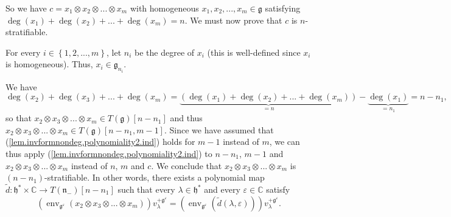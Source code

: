 \documentclass
[numbers=enddot,12pt,final,onecolumn,german,notitlepage]{scrartcl}%
\theoremstyle{definition}
\begin{document}
So we have $c=x_{1}\otimes x_{2}\otimes...\otimes x_{m}$ with
homogeneous\textbf{ }$x_{1},x_{2},...,x_{m}\in\mathfrak{g}$ satisfying
$\deg\left(  x_{1}\right)  +\deg\left(  x_{2}\right)  +...+\deg\left(
x_{m}\right)  =n$. We must now prove that $c$ is $n$-stratifiable.

For every $i\in\left\{  1,2,...,m\right\}  $, let $n_{i}$ be the degree of
$x_{i}$ (this is well-defined since $x_{i}$ is homogeneous). Thus, $x_{i}%
\in\mathfrak{g}_{n_{i}}$.

We have%
\[
\deg\left(  x_{2}\right)  +\deg\left(  x_{3}\right)  +...+\deg\left(
x_{m}\right)  =\underbrace{\left(  \deg\left(  x_{1}\right)  +\deg\left(
x_{2}\right)  +...+\deg\left(  x_{m}\right)  \right)  }_{=n}-\underbrace{\deg
\left(  x_{1}\right)  }_{=n_{1}}=n-n_{1},
\]
so that $x_{2}\otimes x_{3}\otimes...\otimes x_{m}\in T\left(  \mathfrak{g}%
\right)  \left[  n-n_{1}\right]  $ and thus $x_{2}\otimes x_{3}\otimes
...\otimes x_{m}\in T\left(  \mathfrak{g}\right)  \left[  n-n_{1},m-1\right]
$. Since we have assumed that (\ref{lem.invformnondeg.polynomiality2.ind})
holds for $m-1$ instead of $m$, we can thus apply
(\ref{lem.invformnondeg.polynomiality2.ind}) to $n-n_{1}$, $m-1$ and
$x_{2}\otimes x_{3}\otimes...\otimes x_{m}$ instead of $n$, $m$ and $c$. We
conclude that $x_{2}\otimes x_{3}\otimes...\otimes x_{m}$ is $\left(
n-n_{1}\right)  $-stratifiable. In other words, there exists a polynomial map
$\widetilde{d}:\mathfrak{h}^{\ast}\times\mathbb{C}\rightarrow T\left(
\mathfrak{n}_{-}\right)  \left[  n-n_{1}\right]  $ such that every $\lambda
\in\mathfrak{h}^{\ast}$ and every $\varepsilon\in\mathbb{C}$ satisfy%
\[
\left(  \operatorname*{env}\nolimits_{\mathfrak{g}^{\varepsilon}}\left(
x_{2}\otimes x_{3}\otimes...\otimes x_{m}\right)  \right)  v_{\lambda
}^{+\mathfrak{g}^{\varepsilon}}=\left(  \operatorname*{env}%
\nolimits_{\mathfrak{g}^{\varepsilon}}\left(  \widetilde{d}\left(
\lambda,\varepsilon\right)  \right)  \right)  v_{\lambda}^{+\mathfrak{g}%
^{\varepsilon}}.
\]
\end{document}
